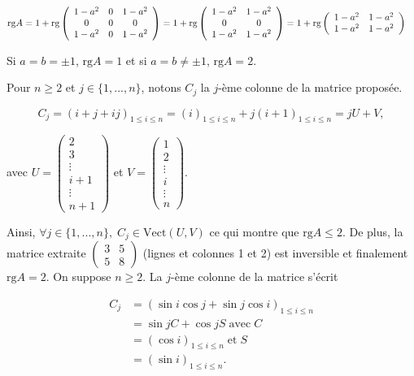 {{\begin{itemize}
\begin{align*}\ensuremath
\mbox{rg}A&=1+\mbox{rg}\left(
\begin{array}{ccc}
1-a^2&0&1-a^2\\
0&0&0\\
1-a^2&0&1-a^2
\end{array}
\right)=1+\mbox{rg}\left(
\begin{array}{cc}
1-a^2&1-a^2\\
0&0\\
1-a^2&1-a^2
\end{array}
\right)=1+\mbox{rg}\left(
\begin{array}{cc}
1-a^2&1-a^2\\
1-a^2&1-a^2
\end{array}
\right)
\end{align*}

Si $a=b=\pm1$, $\mbox{rg}A=1$ et si $a=b\neq\pm1$, $\mbox{rg}A=2$.
\end{itemize}
Pour $n\geq2$ et $j\in\{1,...,n\}$, notons $C_j$ la $j$-ème colonne de la matrice proposée.

$$C_j=(i+j+ij)_{1\leq i\leq n}=(i)_{1\leq i\leq n}+j(i+1)_{1\leq i\leq n}=jU+V,$$

avec $U=\left(\begin{array}{c}
2\\
3\\
\vdots\\
i+1\\
\vdots\\
n+1
\end{array}
\right)$ 
et $V=\left(\begin{array}{c}
1\\
2\\
\vdots\\
i\\
\vdots\\
n
\end{array}
\right)$.

Ainsi, $\forall j\in\{1,...,n\},\;C_j\in\mbox{Vect}(U,V)$ ce qui montre que $\mbox{rg}A\leq2$.
De plus, la matrice extraite $\left(
\begin{array}{cc}
3&5\\
5&8
\end{array}
\right)$ (lignes et colonnes 1 et 2) est inversible et finalement $\mbox{rg}A=2$.
On suppose $n\geq2$. La $j$-ème colonne de la matrice s'écrit

\begin{align*}
C_j &= (\sin i\cos j+\sin j\cos i)_{1\leq i\leq n} \\
&= \sin jC+\cos jS\;\mbox{avec}\;C \\
&= (\cos i)_{1\leq i\leq n}\;\mbox{et}\;S \\
&= (\sin i)_{1\leq i\leq n}.
\end{align*}

}}
